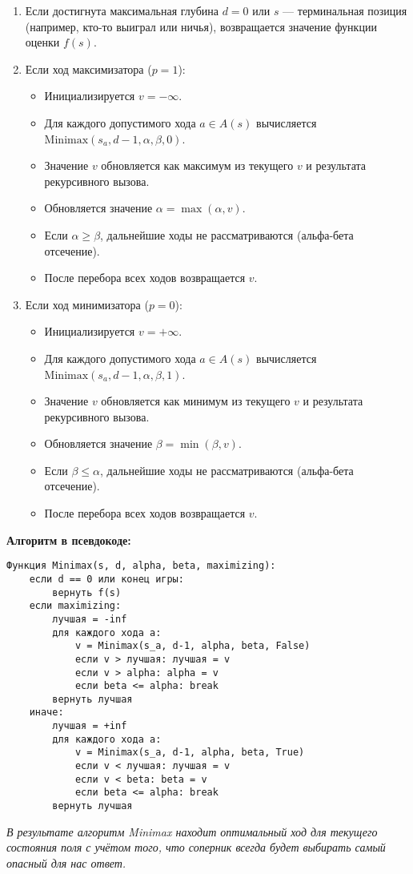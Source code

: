 \begin{enumerate}
    \item Если достигнута максимальная глубина $d = 0$ или $s$ — терминальная позиция (например, кто-то выиграл или ничья), возвращается значение функции оценки $f(s)$.

    \item Если ход максимизатора ($p=1$):
    \begin{itemize}
        \item Инициализируется $v = -\infty$.
        \item Для каждого допустимого хода $a \in A(s)$ вычисляется $\mathrm{Minimax}(s_a, d-1, \alpha, \beta, 0)$.
        \item Значение $v$ обновляется как максимум из текущего $v$ и результата рекурсивного вызова.
        \item Обновляется значение $\alpha = \max(\alpha, v)$.
        \item Если $\alpha \geq \beta$, дальнейшие ходы не рассматриваются (альфа-бета отсечение).
        \item После перебора всех ходов возвращается $v$.
    \end{itemize}
    
    \item Если ход минимизатора ($p=0$):
    \begin{itemize}
        \item Инициализируется $v = +\infty$.
        \item Для каждого допустимого хода $a \in A(s)$ вычисляется $\mathrm{Minimax}(s_a, d-1, \alpha, \beta, 1)$.
        \item Значение $v$ обновляется как минимум из текущего $v$ и результата рекурсивного вызова.
        \item Обновляется значение $\beta = \min(\beta, v)$.
        \item Если $\beta \leq \alpha$, дальнейшие ходы не рассматриваются (альфа-бета отсечение).
        \item После перебора всех ходов возвращается $v$.
    \end{itemize}
\end{enumerate}

\vspace{1ex}

\textbf{Алгоритм в псевдокоде:}

\begin{verbatim}
Функция Minimax(s, d, alpha, beta, maximizing):
    если d == 0 или конец игры:
        вернуть f(s)
    если maximizing:
        лучшая = -inf
        для каждого хода a:
            v = Minimax(s_a, d-1, alpha, beta, False)
            если v > лучшая: лучшая = v
            если v > alpha: alpha = v
            если beta <= alpha: break
        вернуть лучшая
    иначе:
        лучшая = +inf
        для каждого хода a:
            v = Minimax(s_a, d-1, alpha, beta, True)
            если v < лучшая: лучшая = v
            если v < beta: beta = v
            если beta <= alpha: break
        вернуть лучшая
\end{verbatim}

\textit{В результате алгоритм Minimax находит оптимальный ход для текущего состояния поля с учётом того, что соперник всегда будет выбирать самый опасный для нас ответ.}
